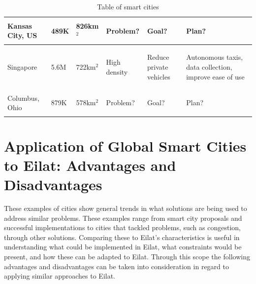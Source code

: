 \documentclass[12pt]{article}                         %
\begin{document}
\begin{table}[h]
\begin{tabular}{ m{1.7cm} | m{1.1cm} | m{1.3cm} | m{3.4cm} | m{3.4cm} | m{3.4cm} }
        Kansas City, US &
        489K &
        826km$^2$ &
        \begin{flushleft}Problem?\end{flushleft} &
        \begin{flushleft}Goal?\end{flushleft} &
        \begin{flushleft}Plan?\end{flushleft} \\
        \hline{}
        
        Singapore &
        5.6M &
        722km$^2$ &
        \begin{flushleft}High density \end{flushleft} &
        \begin{flushleft}Reduce private vehicles \end{flushleft} &
        \begin{flushleft}Autonomous taxis, data collection, improve ease of use\end{flushleft} \\
        \hline{}
        
        Columbus, Ohio &
        879K &
        578km$^2$ &
        \begin{flushleft}Problem?\end{flushleft} &
        \begin{flushleft}Goal?\end{flushleft} &
        \begin{flushleft}Plan?\end{flushleft}
    \end{tabular}
    \caption{Table of smart cities}
    \label{tab:smart_cities}
\end{table}

\section{Application of Global Smart Cities to Eilat: Advantages and Disadvantages}
These examples of cities show general trends in what solutions are being used to address similar problems. These examples range from smart city proposals and successful implementations to cities that tackled problems, such as congestion, through other solutions. Comparing these to Eilat’s characteristics is useful in understanding what could be implemented in Eilat, what constraints would be present, and how these can be adapted to Eilat. Through this scope the following advantages and disadvantages can be taken into consideration in regard to applying similar approaches to Eilat. 
\end{document}
